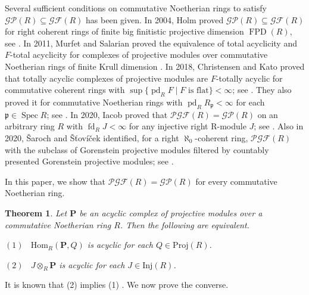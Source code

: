\documentclass[11pt]{amsart}
\newtheorem*{theorem*}{Theorem}
\theoremstyle{remark}
\begin{document}
\medskip

Several sufficient conditions on commutative Noetherian rings to satisfy $\mathcal{GP}(R)\subseteq\mathcal{GF}(R)$ has been given.
In 2004, Holm proved $\mathcal{GP}(R)\subseteq\mathcal{GF}(R)$ for right coherent rings of finite big finitistic projective dimension   $\operatorname{FPD}(R)$, see \cite[Proposition~3.1]{holm}. 
In 2011, Murfet and Salarian proved the equivalence of total acyclicity and $F$-total acyclicity for complexes of projective modules over commutative Noetherian rings of finite Krull dimension \cite[Lemma~4.20]{murfet-salarian}.
In 2018, Christensen and Kato proved that totally acyclic complexes of projective modules are $F$-totally acyclic for commutative coherent rings with $\sup\{\operatorname{pd}_R F\mid F\text{ is flat}\}<\infty$; see \cite[Claims~2.5]{christensen-kato}.
They also proved it for commutative Noetherian rings with $\operatorname{pd}_R R_{\mathfrak p}<\infty$ for each $\mathfrak p\in\operatorname{Spec}R$; see \cite[Claims~2.8]{christensen-kato}.
In 2020, Iacob proved that $\mathcal{PGF}(R)=\mathcal{GP}(R)$  on an arbitrary ring $R$ with $\operatorname{fd}_R J<\infty$ for any injective right R-module $J$; see \cite[Proposition~9]{iacob}.
Also in 2020, \v{S}aroch and \v{S}\v{t}ov\'{i}\v{c}ek identified, for a right $\aleph_0$-coherent ring, $\mathcal{PGF}(R)$ with the subclass of Gorenstein projective modules filtered by countably presented Gorenstein projective modules; see \cite[Theorem~4.9]{saroch-stovicek}.

\medskip

In this paper, we show that $\mathcal{PGF}(R)=\mathcal{GP}(R)$ for every commutative Noetherian ring. 
\begin{theorem*}
Let $\mathbf P$ be an acyclic complex of projective modules over a commutative Noetherian ring $R$. Then the following are equivalent.

$(1)$ \ $\mathrm{Hom}_R(\mathbf P, Q)$ is acyclic for each $Q \in \mathrm{Proj}(R)$.

$(2)$ \ $J \otimes_R \mathbf P$ is acyclic for each $J \in \mathrm{Inj}(R)$.
\end{theorem*}

It is known that (2) implies (1) \cite[Lemma~4.20(ii)]{murfet-salarian}. We now prove the converse.

\end{document}
